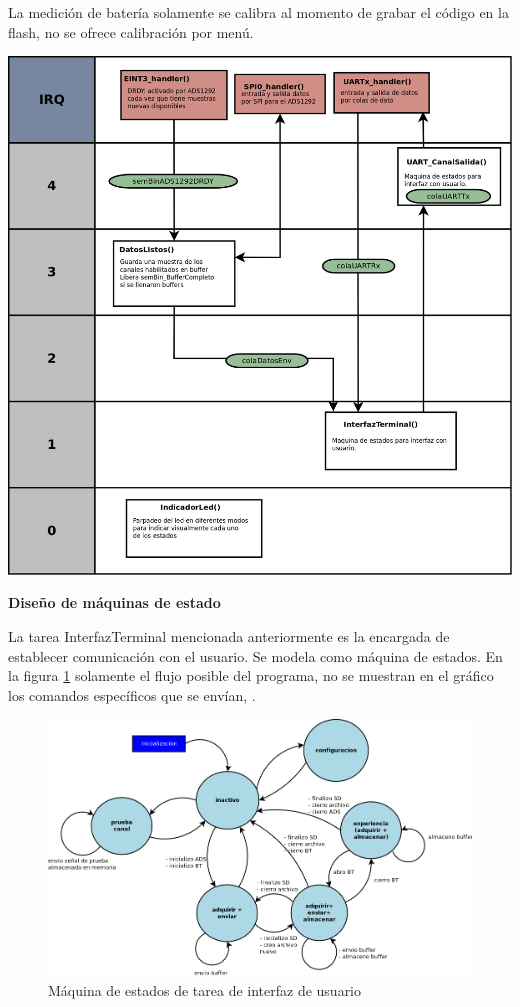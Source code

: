 \begin{itemize}
La medición de batería solamente se calibra al momento de grabar el código en la flash, no se ofrece calibración por menú.

\begin{adjustbox}{center,caption={Diagrama de tareas en modo configuración},label={fig:VOP24_tareas_v1_configuracion},nofloat=figure,vspace=\bigskipamount}
\includegraphics[angle= 90, scale = 0.18]{./Figures/VOP24_tareas_v1_configuracion.png}
\end{adjustbox}

\end{itemize}

\textbf{Diseño de máquinas de estado}

La tarea InterfazTerminal mencionada anteriormente es la encargada de establecer comunicación con el usuario. Se modela como máquina de estados. En la figura \ref{fig:VOP_mde_v1} solamente el flujo posible del programa, no se muestran en el gráfico los comandos específicos que se envían, .


\begin{figure}[!htbp]
	\centering
	\includegraphics[width=\textwidth]{./Figures/VOP_mde_v1.png}
	\caption{Máquina de estados de tarea de interfaz de usuario}
	\label{fig:VOP_mde_v1}
\end{figure}


